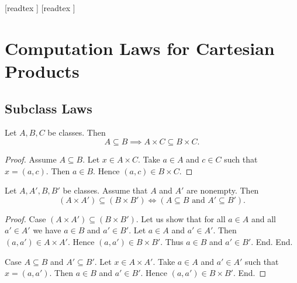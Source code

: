 \documentclass[10pt]{article}
\begin{document}
  \begin{imports}
    \begin{forthel}
      [readtex ]
      [readtex ]
    \end{forthel}
  \end{imports}

  \section{Computation Laws for Cartesian Products}

  \subsection{Subclass Laws}

  \begin{forthel}
    \begin{proposition}
      Let $A, B, C$ be classes.
      Then \[ A \subseteq B \implies A \times C \subseteq B \times C. \]
    \end{proposition}
    \begin{proof}
      Assume $A \subseteq B$.
      Let $x \in A \times C$.
      Take $a \in A$ and $c \in C$ such that $x = (a, c)$.
      Then $a \in B$.
      Hence $(a, c) \in B \times C$.
    \end{proof}
  \end{forthel}

  \begin{forthel}
    \begin{proposition}
      Let $A, A', B, B'$ be classes.
      Assume that $A$ and $A'$ are nonempty.
      Then \[ (A \times A') \subseteq (B \times B') \iff
      (\text{$A \subseteq B$ and $A' \subseteq B'$}). \]
    \end{proposition}
    \begin{proof}
      Case $(A \times A') \subseteq (B \times B')$.
        Let us show that for all $a \in A$ and all $a' \in A'$ we have $a \in B$
        and $a' \in B'$.
          Let $a \in A$ and $a' \in A'$.
          Then $(a, a') \in A \times A'$.
          Hence $(a, a') \in B \times B'$.
          Thus $a \in B$ and $a' \in B'$.
        End.
      End.

      Case $A \subseteq B$ and $A' \subseteq B'$.
        Let $x \in A \times A'$.
        Take $a \in A$ and $a' \in A'$ such that $x = (a, a')$.
        Then $a \in B$ and $a' \in B'$.
        Hence $(a, a') \in B \times B'$.
      End.
    \end{proof}
  \end{forthel}
\end{document}
